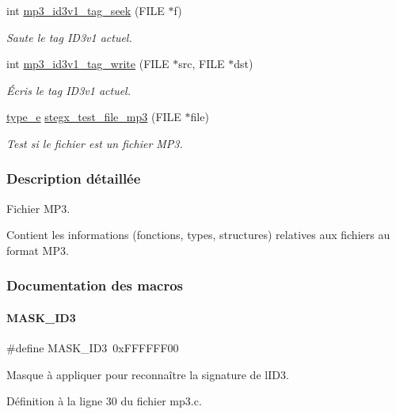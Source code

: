 \begin{DoxyCompactItemize}
int \hyperlink{a00086_ab0fd93a465f2e320e749093c17f20823}{mp3\+\_\+id3v1\+\_\+tag\+\_\+seek} (F\+I\+LE $\ast$f)
\begin{DoxyCompactList}\small\item\em Saute le tag I\+D3v1 actuel. \end{DoxyCompactList}\item 
int \hyperlink{a00086_a0f2f8f49760a8be1dc011675b01f63d1}{mp3\+\_\+id3v1\+\_\+tag\+\_\+write} (F\+I\+LE $\ast$src, F\+I\+LE $\ast$dst)
\begin{DoxyCompactList}\small\item\em Écris le tag I\+D3v1 actuel. \end{DoxyCompactList}\item 
\hyperlink{a00047_af1ca434cca36ba9fb2a45f6cef3a16d6}{type\+\_\+e} \hyperlink{a00086_a581193a38ac3c779c8920bd3be9883fc}{stegx\+\_\+test\+\_\+file\+\_\+mp3} (F\+I\+LE $\ast$file)
\begin{DoxyCompactList}\small\item\em Test si le fichier est un fichier M\+P3. \end{DoxyCompactList}\end{DoxyCompactItemize}


\subsubsection{Description détaillée}
Fichier M\+P3. 

Contient les informations (fonctions, types, structures) relatives aux fichiers au format M\+P3. 

\subsubsection{Documentation des macros}
\mbox{\label{a00086_af29eebe797f1bb6a0197ab437fdcd272}} 
\paragraph{\texorpdfstring{M\+A\+S\+K\+\_\+\+I\+D3}{MASK\_ID3}}
{\footnotesize\ttfamily \#define M\+A\+S\+K\+\_\+\+I\+D3~0x\+F\+F\+F\+F\+F\+F00}

Masque à appliquer pour reconnaître la signature de l\textquotesingle{}I\+D3. 

Définition à la ligne 30 du fichier mp3.\+c.

